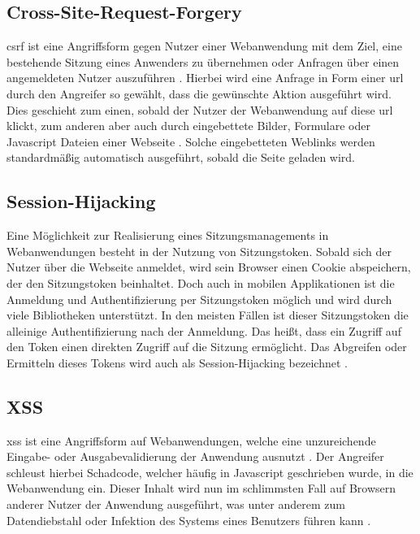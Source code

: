 
\clearpage

\subsection{Cross-Site-Request-Forgery}
\gls{csrf} ist eine Angriffsform gegen Nutzer einer Webanwendung mit dem Ziel, eine bestehende Sitzung eines Anwenders zu übernehmen oder Anfragen über einen angemeldeten Nutzer auszuführen \cite[S.~83]{websecurity-book}.
Hierbei wird eine Anfrage in Form einer \gls{url} durch den Angreifer so gewählt, dass die gewünschte Aktion ausgeführt wird.
Dies geschieht zum einen, sobald der Nutzer der Webanwendung auf diese \gls{url} klickt, zum anderen aber auch durch eingebettete Bilder, Formulare oder Javascript Dateien einer Webseite \cite[S.~81]{websecurity-book}. Solche eingebetteten Weblinks werden standardmäßig automatisch ausgeführt, sobald die Seite geladen wird.

\subsection{Session-Hijacking}
Eine Möglichkeit zur Realisierung eines Sitzungsmanagements in Webanwendungen besteht in der Nutzung von Sitzungstoken.
Sobald sich der Nutzer über die Webseite anmeldet, wird sein Browser einen Cookie abspeichern, der den Sitzungstoken beinhaltet. Doch auch in mobilen Applikationen ist die Anmeldung und Authentifizierung per Sitzungstoken möglich und wird durch viele Bibliotheken unterstützt.
In den meisten Fällen ist dieser Sitzungstoken die alleinige Authentifizierung nach der Anmeldung.
Das heißt, dass ein Zugriff auf den Token einen direkten Zugriff auf die Sitzung ermöglicht.
Das Abgreifen oder Ermitteln dieses Tokens wird auch als Session-Hijacking bezeichnet  \cite[S.~89]{websecurity-book}.

\subsection{XSS}
\gls{xss} ist eine Angriffsform auf Webanwendungen, welche eine unzureichende Eingabe- oder Ausgabevalidierung der Anwendung ausnutzt \cite[S.~79]{websecurity-book}.
Der Angreifer schleust hierbei Schadcode, welcher häufig in Javascript geschrieben wurde, in die Webanwendung ein.
Dieser Inhalt wird nun im schlimmsten Fall auf Browsern anderer Nutzer der Anwendung ausgeführt, was unter anderem zum Datendiebstahl oder Infektion des Systems eines Benutzers führen kann \cite[S.~77]{websecurity-book}.

